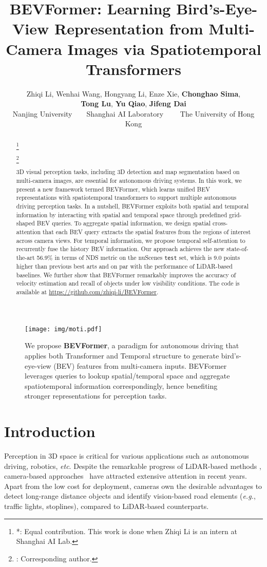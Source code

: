 \documentclass{article}
\title{BEVFormer: Learning Bird's-Eye-View Representation from Multi-Camera Images via Spatiotemporal Transformers}
\author{
Zhiqi Li,
Wenhai Wang,
Hongyang Li,
Enze Xie,
\textbf{Chonghao Sima}, \\
\textbf{Tong Lu},
\textbf{Yu Qiao},
\textbf{Jifeng Dai}\textsuperscript{\Letter}
\\ [0.15cm]
Nanjing University~~~~Shanghai AI Laboratory~~~~
The University of Hong Kong
}
\newcommand\blfootnote[1]{\begingroup
\renewcommand\thefootnote{}\footnote{#1}\addtocounter{footnote}{-1}\endgroup
}
\begin{document}
\maketitle
\begin{figure}[h]
\centering
\texttt{[image: img/moti.pdf]}
\caption{We propose \textbf{BEVFormer}, a paradigm
for autonomous driving that applies 
both Transformer and Temporal structure to generate 
bird's-eye-view (BEV) features from multi-camera inputs. 
BEVFormer leverages 
queries to lookup spatial/temporal space and aggregate spatiotemporal information correspondingly, 
hence benefiting stronger representations for perception tasks.
}
\label{fig:moti}
\end{figure}



\begin{abstract}
\blfootnote{*: Equal contribution. This work is done when Zhiqi Li is an intern at Shanghai AI Lab.}
\blfootnote{\Letter: Corresponding author.}
3D visual perception tasks, including 3D detection and map segmentation based on multi-camera images, are essential for autonomous driving systems. In this work, we present a new framework termed BEVFormer, which learns unified BEV representations with spatiotemporal transformers to support multiple autonomous driving perception tasks. In a nutshell, BEVFormer exploits both spatial and temporal information by interacting with spatial and temporal space through predefined grid-shaped BEV queries. To aggregate spatial information, we design spatial cross-attention that each BEV query extracts the spatial features from the regions of interest across camera views. For temporal information, we propose temporal self-attention to recurrently fuse the history BEV information.
Our approach achieves the new state-of-the-art 56.9\% in terms of NDS metric on the nuScenes \texttt{test} set, which is 9.0 points higher than previous best arts and on par with the performance of LiDAR-based baselines. We further show that BEVFormer remarkably improves the accuracy of velocity estimation and recall of objects under low visibility conditions. The code is available at \url{https://github.com/zhiqi-li/BEVFormer}.


\end{abstract}



\section{Introduction}
Perception in 3D space is critical for various applications such as autonomous driving, robotics, \textit{etc}.
Despite the remarkable progress of LiDAR-based methods \cite{vora2020pointpainting,lang2019pointpillars,zhou2018voxelnet,yan2018second,chen2017multi},
camera-based approaches~\cite{wang2021fcos3d,philion2020lift,wang2022detr3d,pan2020cross} have attracted extensive attention in recent years.
Apart from the low cost for deployment, cameras own the desirable advantages to detect long-range distance objects and identify vision-based road elements (\textit{e.g.}, traffic lights, stoplines), compared to LiDAR-based counterparts.
\end{document}
